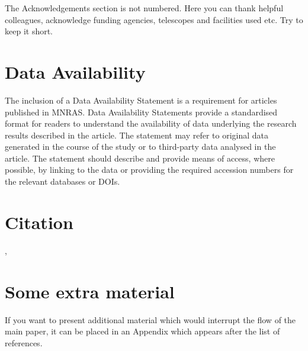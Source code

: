 \documentclass[fleqn,usenatbib]{mnras}
\begin{document}
The Acknowledgements section is not numbered. Here you can thank helpful
colleagues, acknowledge funding agencies, telescopes and facilities used etc.
Try to keep it short.

\section*{Data Availability}

 
The inclusion of a Data Availability Statement is a requirement for articles published in MNRAS. Data Availability Statements provide a standardised format for readers to understand the availability of data underlying the research results described in the article. The statement may refer to original data generated in the course of the study or to third-party data analysed in the article. The statement should describe and provide means of access, where possible, by linking to the data or providing the required accession numbers for the relevant databases or DOIs.

\section{Citation}
\cite{Sato_2009}, \cite{2015MNRAS.453.3043S}




 



\appendix

\section{Some extra material}

If you want to present additional material which would interrupt the flow of the main paper,
it can be placed in an Appendix which appears after the list of references.



\bsp	%
\label{lastpage}
\end{document}
